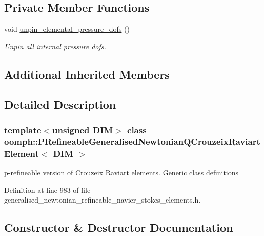 \subsection*{Private Member Functions}
\begin{DoxyCompactItemize}
\item 
void \hyperlink{classoomph_1_1PRefineableGeneralisedNewtonianQCrouzeixRaviartElement_a2e603c22bdef7f5a9ebf82dd46a3fae2}{unpin\+\_\+elemental\+\_\+pressure\+\_\+dofs} ()
\begin{DoxyCompactList}\small\item\em Unpin all internal pressure dofs. \end{DoxyCompactList}\end{DoxyCompactItemize}
\subsection*{Additional Inherited Members}


\subsection{Detailed Description}
\subsubsection*{template$<$unsigned D\+IM$>$\newline
class oomph\+::\+P\+Refineable\+Generalised\+Newtonian\+Q\+Crouzeix\+Raviart\+Element$<$ D\+I\+M $>$}

p-\/refineable version of Crouzeix Raviart elements. Generic class definitions 

Definition at line 983 of file generalised\+\_\+newtonian\+\_\+refineable\+\_\+navier\+\_\+stokes\+\_\+elements.\+h.



\subsection{Constructor \& Destructor Documentation}
\mbox{\label{classoomph_1_1PRefineableGeneralisedNewtonianQCrouzeixRaviartElement_a106d51c7303c556be85aff5b3bab6196}} 
